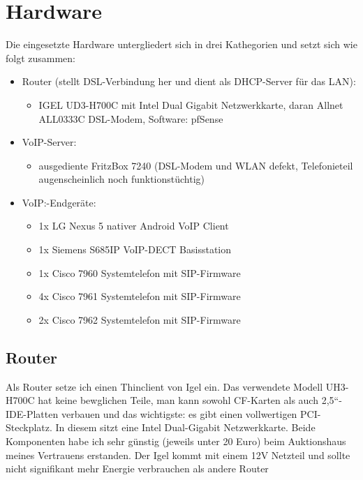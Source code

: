 \documentclass[a4paper,12pt]{scrbook}
\begin{document}
\chapter{Hardware}
\label{sec:1}

Die eingesetzte Hardware untergliedert sich in drei Kathegorien und setzt sich wie folgt zusammen:

\begin{itemize}
 \item Router (stellt DSL-Verbindung her und dient als DHCP-Server für das LAN):
 \begin{itemize}
  \item IGEL UD3-H700C mit Intel Dual Gigabit Netzwerkkarte, daran Allnet ALL0333C DSL-Modem, Software: pfSense
 \end{itemize}
 \item VoIP-Server: 
 \begin{itemize}
  \item ausgediente FritzBox 7240 (DSL-Modem und WLAN defekt, Telefonieteil augenscheinlich noch funktionstüchtig)
 \end{itemize}
 \item VoIP:-Endgeräte:
 \begin{itemize}
  \item 1x LG Nexus 5 nativer Android VoIP Client
  \item 1x Siemens S685IP VoIP-DECT Basisstation
  \item 1x Cisco 7960 Systemtelefon mit SIP-Firmware
  \item 4x Cisco 7961 Systemtelefon mit SIP-Firmware
  \item 2x Cisco 7962 Systemtelefon mit SIP-Firmware
 \end{itemize}
\end{itemize}

\section{Router}
Als Router setze ich einen Thinclient von Igel ein. Das verwendete Modell UH3-H700C hat keine bewglichen Teile, 
man kann sowohl CF-Karten als auch 2,5``-IDE-Platten verbauen und das wichtigste: es gibt einen vollwertigen PCI-Steckplatz.
In diesem sitzt eine Intel Dual-Gigabit Netzwerkkarte. Beide Komponenten habe ich sehr günstig (jeweils unter 20 Euro) beim
Auktionshaus meines Vertrauens erstanden. Der Igel kommt mit einem 12V Netzteil und sollte nicht signifikant mehr Energie
verbrauchen als andere Router
\end{document}
